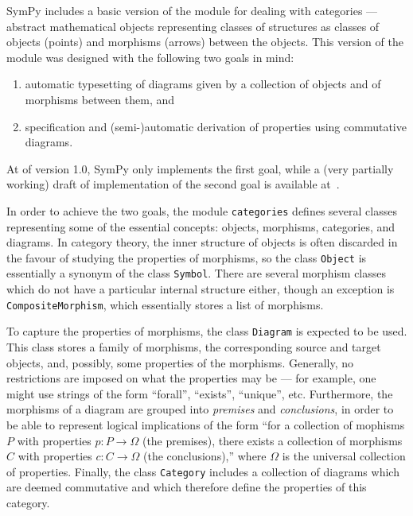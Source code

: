 SymPy includes a basic version of the module for dealing with categories ---
abstract mathematical objects representing classes of structures as classes of
objects (points) and morphisms (arrows) between the objects.  This version of
the module was designed with the following two goals in mind:

\begin{enumerate}
\item automatic typesetting of diagrams given by a collection of
  objects and of morphisms between them, and
\item specification and (semi-)automatic derivation of properties
  using commutative diagrams.
\end{enumerate}

At of version 1.0, SymPy only implements the first goal, while a (very partially
working) draft of implementation of the second goal is available
at~\cite{ct4commutativity}.

In order to achieve the two goals, the module \texttt{categories} defines
several classes representing some of the essential concepts: objects, morphisms,
categories, and diagrams.  In category theory, the inner structure of objects is
often discarded in the favour of studying the properties of morphisms, so the
class \texttt{Object} is essentially a synonym of the class \texttt{Symbol}.
There are several morphism classes which do not have a particular internal
structure either, though an exception is \texttt{CompositeMorphism}, which
essentially stores a list of morphisms.

To capture the properties of morphisms, the class \texttt{Diagram} is expected
to be used.  This class stores a family of morphisms, the corresponding source
and target objects, and, possibly, some properties of the morphisms.  Generally,
no restrictions are imposed on what the properties may be --- for example, one
might use strings of the form ``forall'', ``exists'', ``unique'', etc.
Furthermore, the morphisms of a diagram are grouped into \textit{premises} and
\textit{conclusions}, in order to be able to represent logical implications of
the form ``for a collection of mophisms $P$ with properties $p:P\to \Omega$ (the
premises), there exists a collection of morphisms $C$ with properties $c:C\to
\Omega$ (the conclusions),'' where $\Omega$ is the universal collection of
properties.  Finally, the class \texttt{Category} includes a collection of
diagrams which are deemed commutative and which therefore define the properties
of this category.

